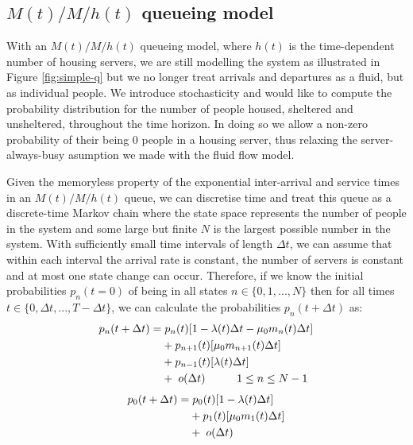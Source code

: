 \documentclass[12pt,a4paper]{article}
\begin{document}
\subsection{$M(t)/M/h(t)$ queueing model}
%
With an $M(t)/M/h(t)$ queueing model, where $h(t)$ is the time-dependent number of housing servers, we are still modelling the system as illustrated in Figure \ref{fig:simple-q} but we no longer treat arrivals and departures as a fluid, but as individual people. We introduce stochasticity and would like to compute the probability distribution for the number of people housed, sheltered and unsheltered, throughout the time horizon. In doing so we allow a non-zero probability of their being $0$ people in a housing server, thus relaxing the server-always-busy asumption we made with the fluid flow model.

Given the memoryless property of the exponential inter-arrival and service times in an $M(t)/M/h(t)$ queue, we can discretise time and treat this queue as a discrete-time Markov chain where the state space represents the number of people in the system and some large but finite $N$ is the largest possible number in the system. With sufficiently small time intervals of length $\Delta t$, we can assume that within each interval the arrival rate is constant, the number of servers is constant and at most one state change can occur. Therefore, if we know the initial probabilities $p_n(t=0)$ of being in all states $n \in \{0,1,...,N\}$ then for all times $t \in \{0, \Delta t,...,T-\Delta t\}$, we can calculate the probabilities $p_n(t + \Delta t)$ as: 
% 
\begin{align*}
  p_n(t+\Delta t) = & \hspace{0.1cm} p_{n}(t)[1-\lambda(t)\Delta t-\mu_0 m_n(t) \Delta t] \\
                    & + p_{n+1}(t)[\mu_0 m_{n+1}(t) \Delta t] \\
                    & + p_{n-1}(t)[\lambda(t) \Delta t] \\
                    & + \hspace{0.1cm} o(\Delta t) \hspace{1cm} 1 \leq n \leq N-1
\end{align*}
% 
\begin{align*}
  p_0(t+\Delta t) = & \hspace{0.1cm} p_{0}(t)[1-\lambda(t)\Delta t] \\
                    & + p_{1}(t)[\mu_0 m_{1}(t) \Delta t] \\
                    & + \hspace{0.1cm} o(\Delta t)
\end{align*}
\end{document}
